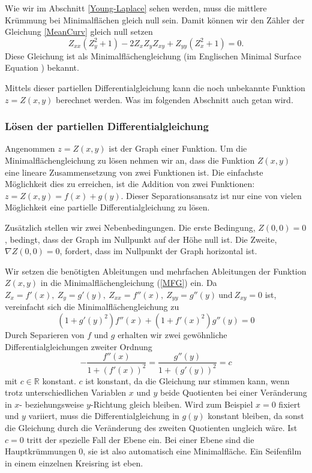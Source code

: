 \begin{refsection}
Wie wir im Abschnitt \ref{Young-Laplace} sehen werden, muss die mittlere Krümmung bei Minimalflächen gleich null sein. Damit können wir den Zähler der Gleichung \eqref{MeanCurv} gleich null setzen
\begin{equation}\label{MFG}
Z_{xx}(Z_y^2+1) - 2 Z_xZ_yZ_{xy}+Z_{yy}(Z_x^2+1)=0.
\end{equation}
Diese Gleichung ist als Minimalflächengleichung (im Englischen Minimal Surface Equation \cite{minimal:Osserman}) bekannt.
%
%

Mittels dieser partiellen Differentialgleichung kann die noch unbekannte Funktion $z=Z(x,y)$ berechnet werden. Was im folgenden Abschnitt auch getan wird.


\subsubsection{Lösen der partiellen Differentialgleichung}\label{Scherk Berechnung}
Angenommen $z=Z(x,y)$ ist der Graph einer Funktion. Um die Minimalflächengleichung zu lösen nehmen wir an, dass die Funktion $Z(x,y)$ eine lineare Zusammensetzung von zwei Funktionen ist. Die einfachste Möglichkeit dies zu erreichen, ist die Addition von zwei Funktionen: $z=Z(x,y)=f(x)+g(y)$. Dieser Separationsansatz ist nur eine von vielen Möglichkeit eine partielle Differentialgleichung zu lösen.
%

Zusätzlich stellen wir zwei Nebenbedingungen. Die erste Bedingung, $Z(0,0)=0$, bedingt, dass der Graph im Nullpunkt auf der Höhe null ist. Die Zweite, $\nabla Z(0,0)=0$, fordert, dass im Nullpunkt der Graph horizontal ist.

Wir setzen die benötigten Ableitungen und mehrfachen Ableitungen der Funktion $Z(x,y)$ in die Minimalflächengleichung (\ref{MFG}) ein. Da $ Z_x = f'(x),\ Z_y = g'(y),\ Z_{xx}=f''(x),\ Z_{yy} = g''(y) \ \text{und} \ Z_{xy}=0$ ist, vereinfacht sich die Minimalflächengleichung zu 
\begin{equation}\label{MFG Scherk}
(1+g'(y)^2)f''(x)+(1+f'(x)^2)g''(y)=0
\end{equation}
Durch Separieren von $f$ und $g$ erhalten wir zwei gewöhnliche Differentialgleichungen zweiter Ordnung
%
\begin{equation}\label{MFG Scherk2}
-\dfrac{f''(x)}{1+(f'(x))^2}=\dfrac{g''(y)}{1+(g'(y))^2}=c
\end{equation}
mit $c \in \mathbb{R}$ konstant. $c$ ist konstant, da die Gleichung nur stimmen kann, wenn trotz unterschiedlichen Variablen $x$ und $y$ beide Quotienten bei einer Veränderung in $x$- beziehungsweise $y$-Richtung gleich bleiben. Wird zum Beispiel $x=0$ fixiert und $y$ variiert, muss die Differentialgleichung in $g(y)$ konstant bleiben, da sonst die Gleichung durch die Veränderung des zweiten Quotienten ungleich wäre. Ist $c=0$ tritt der spezielle Fall der Ebene ein. Bei einer Ebene sind die 
Hauptkrümmungen 0, sie ist also automatisch eine Minimalfläche. Ein Seifenfilm in einem einzelnen Kreisring ist eben.


\end{refsection}
